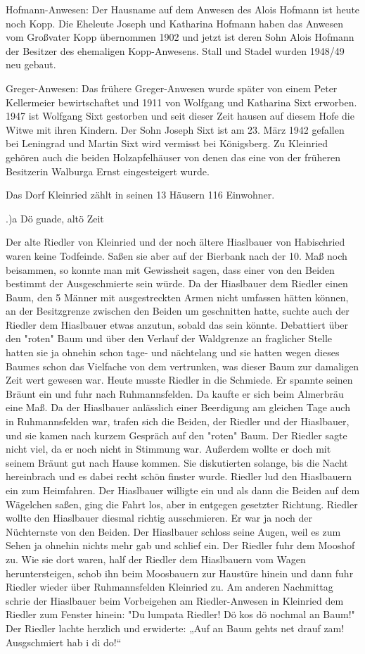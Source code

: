 Hofmann-Anwesen: Der Hausname auf dem Anwesen des Alois Hofmann ist heute noch
Kopp. Die Eheleute Joseph und Katharina Hofmann haben das Anwesen vom Großvater
Kopp übernommen 1902 und jetzt ist deren Sohn Alois Hofmann der Besitzer des
ehemaligen Kopp-Anwesens. Stall und Stadel wurden 1948/49 neu gebaut.

Greger-Anwesen: Das frühere Greger-Anwesen wurde später von einem Peter
Kellermeier bewirtschaftet und 1911 von Wolfgang und Katharina Sixt erworben.
1947 ist Wolfgang Sixt gestorben und seit dieser Zeit hausen auf diesem Hofe die
Witwe mit ihren Kindern. Der Sohn Joseph Sixt ist am 23. März 1942 gefallen bei
Leningrad und Martin Sixt wird vermisst bei Königsberg. Zu Kleinried gehören
auch die beiden Holzapfelhäuser von denen das eine von der früheren Besitzerin
Walburga Ernst eingesteigert wurde.

Das Dorf Kleinried zählt in seinen 13 Häusern 116 Einwohner.

.)a Dö guade, altö Zeit

Der alte Riedler von Kleinried und der noch ältere Hiaslbauer von Habischried
waren keine Todfeinde. Saßen sie aber auf der Bierbank nach der 10. Maß noch
beisammen, so konnte man mit Gewissheit sagen, dass einer von den Beiden
bestimmt der Ausgeschmierte sein würde. Da der Hiaslbauer dem Riedler einen
Baum, den 5 Männer mit ausgestreckten Armen nicht umfassen hätten können, an der
Besitzgrenze zwischen den Beiden um geschnitten hatte, suchte auch der Riedler
dem Hiaslbauer etwas anzutun, sobald das sein könnte. Debattiert über den
"roten" Baum und über den Verlauf der Waldgrenze an fraglicher Stelle hatten sie
ja ohnehin schon tage- und nächtelang und sie hatten wegen dieses Baumes schon
das Vielfache von dem vertrunken, was dieser Baum zur damaligen Zeit wert
gewesen war. Heute musste Riedler in die Schmiede. Er spannte seinen Bräunt ein
und fuhr nach Ruhmannsfelden. Da kaufte er sich beim Almerbräu eine Maß. Da der
Hiaslbauer anlässlich einer Beerdigung am gleichen Tage auch in Ruhmannsfelden
war, trafen sich die Beiden, der Riedler und der Hiaslbauer, und sie kamen nach
kurzem Gespräch auf den "roten" Baum. Der Riedler sagte nicht viel, da er noch
nicht in Stimmung war. Außerdem wollte er doch mit seinem Bräunt gut nach Hause
kommen. Sie diskutierten solange, bis die Nacht hereinbrach und es dabei recht
schön finster wurde. Riedler lud den Hiaslbauern ein zum Heimfahren. Der
Hiaslbauer willigte ein und als dann die Beiden auf dem Wägelchen saßen, ging
die Fahrt los, aber in entgegen gesetzter Richtung. Riedler wollte den
Hiaslbauer diesmal richtig ausschmieren. Er war ja noch der Nüchternste von den
Beiden. Der Hiaslbauer schloss seine Augen, weil es zum Sehen ja ohnehin nichts
mehr gab und schlief ein. Der Riedler fuhr dem Mooshof zu. Wie sie dort waren,
half der Riedler dem Hiaslbauern vom Wagen heruntersteigen, schob ihn beim
Moosbauern zur Haustüre hinein und dann fuhr Riedler wieder über Ruhmannsfelden
Kleinried zu. Am anderen Nachmittag schrie der Hiaslbauer beim Vorbeigehen am
Riedler-Anwesen in Kleinried dem Riedler zum Fenster hinein: "Du lumpata
Riedler! Dö kos dö nochmal an Baum!" Der Riedler lachte herzlich und erwiderte:
„Auf an Baum gehts net drauf zam! Ausgschmiert hab i di do!“

